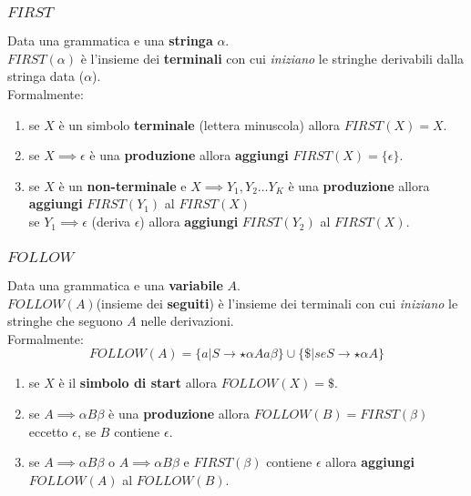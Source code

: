 \documentclass[14pt]{extarticle}
\begin{document}
\subsubsection{$FIRST$}
Data una grammatica e una \textbf{stringa} $\alpha$.\\
$FIRST(\alpha)$ è l'insieme dei \textbf{terminali} con cui \textit{iniziano} le stringhe derivabili dalla stringa data ($\alpha$).\\
Formalmente:
\begin{equation*}
\end{equation*}
\begin{enumerate}
    \item se $X$ è un simbolo \textbf{terminale} (lettera minuscola) allora $FIRST(X)=X$.
    \item se $X \implies \epsilon$ è una \textbf{produzione} allora \textbf{aggiungi} $FIRST(X)=\{\epsilon\}$.
    \item se $X$ è un \textbf{non-terminale} e $X \implies Y_1,Y_2\dots Y_K$ è una \textbf{produzione} allora \textbf{aggiungi} $FIRST(Y_1)$ al $FIRST(X)$\\
            se $Y_1 \implies \epsilon$ (deriva $\epsilon$) allora \textbf{aggiungi} $FIRST(Y_2)$ al $FIRST(X)$.
\end{enumerate}

\subsubsection{$FOLLOW$}
Data una grammatica e una \textbf{variabile} $A$.\\
$FOLLOW(A)$(insieme dei \textbf{seguiti}) è l'insieme dei terminali con cui \textit{iniziano} le stringhe che seguono $A$ nelle derivazioni.\\
Formalmente:
\begin{equation*}
    FOLLOW(A)=\{a|S \rightarrow \star \alpha Aa\beta\} \cup \{\$|se S \rightarrow \star \alpha A\}
\end{equation*}
\begin{enumerate}
    \item se $X$ è il \textbf{simbolo di start} allora $FOLLOW(X)=\$$.
    \item se $A \implies \alpha B \beta$ è una \textbf{produzione} allora $FOLLOW(B)=FIRST(\beta)$ eccetto $\epsilon$, se $B$ contiene $\epsilon$.
    \item se $A \implies \alpha B \beta$ o $A \implies \alpha B \beta$ e $FIRST(\beta)$ contiene $\epsilon$ allora \textbf{aggiungi} $FOLLOW(A)$ al $FOLLOW(B)$.
\end{enumerate}
\end{document}
